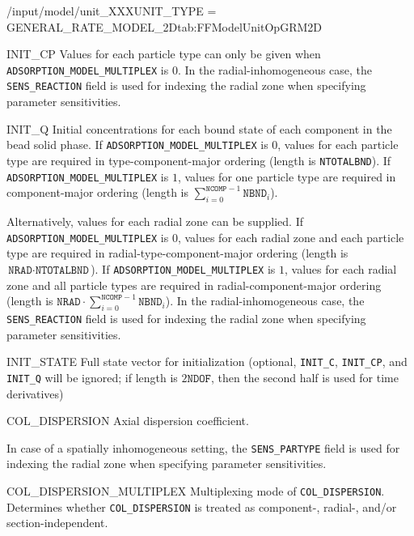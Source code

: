 \begin{condsubgroup}{/input/model/unit\_XXX}{UNIT\_TYPE = GENERAL\_RATE\_MODEL\_2D}{tab:FFModelUnitOpGRM2D}
\begin{dataset}[unit=\si{\mol\per\cubic\metre\of{MP}},type=double,range={$\geq 0$}]{INIT\_CP}
    Values for each particle type can only be given when \texttt{ADSORPTION\_MODEL\_MULTIPLEX} is $0$.
    In the radial-inhomogeneous case, the \texttt{SENS\_REACTION} field is used for indexing the radial zone when specifying parameter sensitivities.
  \end{dataset}
  \begin{dataset}[unit=\si{\mol\per\cubic\metre\of{SP}},type=double,range={$\geq 0$}]{INIT\_Q}
    Initial concentrations for each bound state of each component in the bead solid phase.
    If \texttt{ADSORPTION\_MODEL\_MULTIPLEX} is $0$, values for each particle type are required in type-component-major ordering (length is \texttt{NTOTALBND}).
    If \texttt{ADSORPTION\_MODEL\_MULTIPLEX} is $1$, values for one particle type are required in component-major ordering (length is $\sum_{i = 0}^{\texttt{NCOMP} - 1} \texttt{NBND}_i$).

    Alternatively, values for each radial zone can be supplied.
    If \texttt{ADSORPTION\_MODEL\_MULTIPLEX} is $0$, values for each radial zone and each particle type are required in radial-type-component-major ordering (length is $\texttt{NRAD} \cdot \texttt{NTOTALBND}$).
    If \texttt{ADSORPTION\_MODEL\_MULTIPLEX} is $1$, values for each radial zone and all particle types are required in radial-component-major ordering (length is $\texttt{NRAD} \cdot \sum_{i = 0}^{\texttt{NCOMP} - 1} \texttt{NBND}_i$).
    In the radial-inhomogeneous case, the \texttt{SENS\_REACTION} field is used for indexing the radial zone when specifying parameter sensitivities.
  \end{dataset}
  \begin{dataset}[unit=various,type=double,range={$\mathds{R}$},length={\texttt{NDOF} / $2\texttt{NDOF}$}]{INIT\_STATE}
    Full state vector for initialization (optional, \texttt{INIT\_C}, \texttt{INIT\_CP}, and \texttt{INIT\_Q} will be ignored; if length is $2\texttt{NDOF}$, then the second half is used for time derivatives)
  \end{dataset}
  \begin{dataset}[unit=\si{\square\metre\of{IV}\per\second},type=double,range={$\geq 0$},length={see \texttt{COL\_DISPERSION\_MULTIPLEX}}]{COL\_DISPERSION}
    Axial dispersion coefficient.

    In case of a spatially inhomogeneous setting, the \texttt{SENS\_PARTYPE} field is used for indexing the radial zone when specifying parameter sensitivities.
  \end{dataset}
  \begin{dataset}[unit=--,type=int,range={$\{0, \dots, 7 \}$},length={1}]{COL\_DISPERSION\_MULTIPLEX}
    Multiplexing mode of \texttt{COL\_DISPERSION}.
    Determines whether \texttt{COL\_DISPERSION} is treated as component-, radial-, and/or section-independent.


\end{dataset}
\end{condsubgroup}

